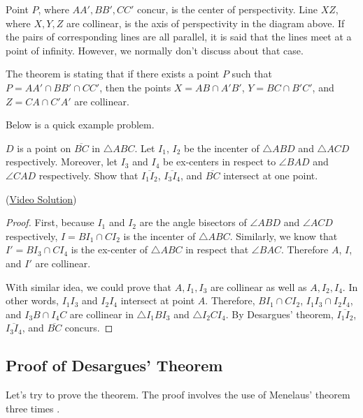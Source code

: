 \documentclass[../main.tex]{subfiles}
\begin{document}
Point $P$, where $AA', BB', CC'$ concur, is the center of
perspectivity. Line $XZ$, where $X, Y, Z$ are collinear, is the axis
of perspectivity in the diagram above. If the pairs of corresponding
lines are all parallel, it is said that the lines meet at a point of
infinity. However, we normally don't discuss about that case.

The theorem is stating that if there exists a point $P$ such that
$P = AA' \cap BB' \cap CC'$, then the points $X = AB \cap A'B'$,
$Y = BC \cap B'C'$, and $Z = CA \cap C'A'$ are collinear.

Below is a quick example problem.

\begin{problem}{}{}
$D$ is a point on $\overline{BC}$ in $\triangle{ABC}$. Let $I_1$,
$I_2$ be the incenter of $\triangle{ABD}$ and $\triangle{ACD}$
respectively. Moreover, let $I_3$ and $I_4$ be ex-centers in
respect to $\angle{BAD}$ and $\angle{CAD}$ respectively. Show that
$\overline{I_1 I_2}$, $\overline{I_3 I_4}$, and $\overline{BC}$
intersect at one point.
\end{problem}
(\href{https://www.youtube.com/watch?v=adwiSgEAIG0}{Video Solution})
\begin{proof}
First, because $I_1$ and $I_2$ are the angle bisectors of
$\angle{ABD}$ and $\angle{ACD}$ respectively, $I = BI_1 \cap CI_2$
is the incenter of $\triangle{ABC}$. Similarly, we know that $I' =
BI_3 \cap CI_4$ is the ex-center of $\triangle{ABC}$ in respect that
$\angle{BAC}$. Therefore $A$, $I$, and $I'$ are collinear.

With similar idea, we could prove that $A, I_1, I_3$ are collinear
as well as $A, I_2, I_4$. In other words, $I_1I_3$ and $I_2I_4$
intersect at point $A$. Therefore, $BI_1 \cap CI_2$, $I_1I_3 \cap
I_2I_4$, and $I_3B \cap I_4C$ are collinear in $\triangle{I_1BI_3}$
and $\triangle{I_2CI_4}$. By Desargues' theorem, $\overline{I_1 I_2}$,
$\overline{I_3 I_4}$, and $\overline{BC}$ concurs.
\end{proof}

\subsection{Proof of Desargues' Theorem}

Let's try to prove the theorem. The proof involves the use of
Menelaus' theorem three times \cite{26023-1}.
\end{document}
